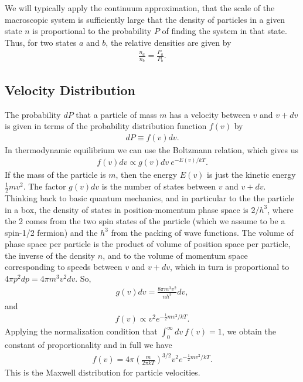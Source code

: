We will typically apply the continuum approximation, that the scale of the macroscopic system is sufficiently large that the density of particles in a given state $n$ is proportional to the probability $P$ of finding the system in that state. Thus, for two states $a$ and $b$, the relative densities are given by
\begin{align}
\frac{n_a}{n_b} = \frac{P_a}{P_b}.
\end{align}

\newslide

\subsection{Velocity Distribution}

The probability $dP$ that a particle of mass $m$ has a velocity between
$v$ and $v+dv$ is given in terms of the probability distribution
function $f(v)$ by
\begin{align}
dP \equiv f(v) dv.
\end{align}
In thermodynamic equilibrium we can use the Boltzmann relation,
which gives us
\begin{align}
f(v) dv \propto g(v) dv\: e^{-E(v)/kT}.
\end{align}
If the mass of the particle is $m$, then the energy $E(v)$ is just the
kinetic energy $\frac{1}{2}mv^2$. The factor $g(v)dv$ is the number of
states between $v$ and $v+dv$. Thinking back to basic quantum mechanics,
and in particular to the the particle in a box, the density of states in
position-momentum phase space is $2/h^3$, where the 2 comes from the two
spin states of the particle (which we assume to be a spin-1/2 fermion)
and the $h^3$ from the packing of wave functions. The volume of phase
space per particle is the product of volume of position space per
particle, the inverse of the density $n$, and to the volume of momentum
space corresponding to speeds between $v$ and $v+dv$, which in turn is
proportional to $4\pi p^2 dp = 4\pi m^3v^2 dv$. So,
\begin{align}
g(v)dv = \frac{8\pi m^3 v^2}{n h^3} dv,
\end{align}
and
\begin{align}
f(v) \propto v^2 e^{-\frac{1}{2}m v^2/kT}.
\end{align}
Applying the normalization condition that $\int_0^\infty\!\!\!dv\:f(v) =
1$, we obtain the constant
of proportionality and in full we have
\begin{align}
f(v) = 4\pi\left(\frac{m}{2\pi k T}\right)^{3/2} v^2 e^{-\frac{1}{2}m v^2/kT}.
\end{align}
This is the Maxwell distribution for particle
velocities.

